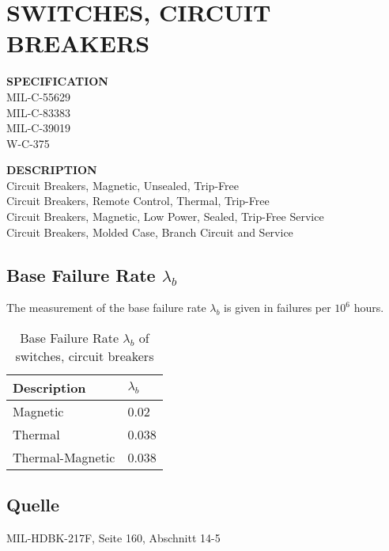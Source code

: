 \section{SWITCHES, CIRCUIT BREAKERS}

\begin{minipage}[t]{0.24\textwidth}
    \textbf{SPECIFICATION}\\
    MIL-C-55629\\MIL-C-83383\\MIL-C-39019\\W-C-375
\end{minipage}
\begin{minipage}[t]{0.75\textwidth}
    \textbf{DESCRIPTION}\\
    Circuit Breakers, Magnetic, Unsealed, Trip-Free\\
    Circuit Breakers, Remote Control, Thermal, Trip-Free\\
    Circuit Breakers, Magnetic, Low Power, Sealed, Trip-Free Service\\
    Circuit Breakers, Molded Case, Branch Circuit and Service
\end{minipage}

\subsection{Base Failure Rate $\lambda_b$}
The measurement of the base failure rate $\lambda_b$ is given in failures per $10^6$ hours.
\begin{table}[ht]
{\centering

\begin{tabular}{|p{7cm}|p{5cm}|}
    \hline
    \textbf{Description} & \textbf{$\lambda_b$} \\
    \hline
    Magnetic & 0.02 \\
    \hline
    Thermal & 0.038 \\
    \hline
    Thermal-Magnetic & 0.038 \\
    \hline
\end{tabular}

\caption{Base Failure Rate $\lambda_b$ of switches, circuit breakers}

\label{tab:bfr_switches_circuit_breakers}
\par}
\end{table}
\subsection*{Quelle}
MIL-HDBK-217F, Seite 160, Abschnitt 14-5